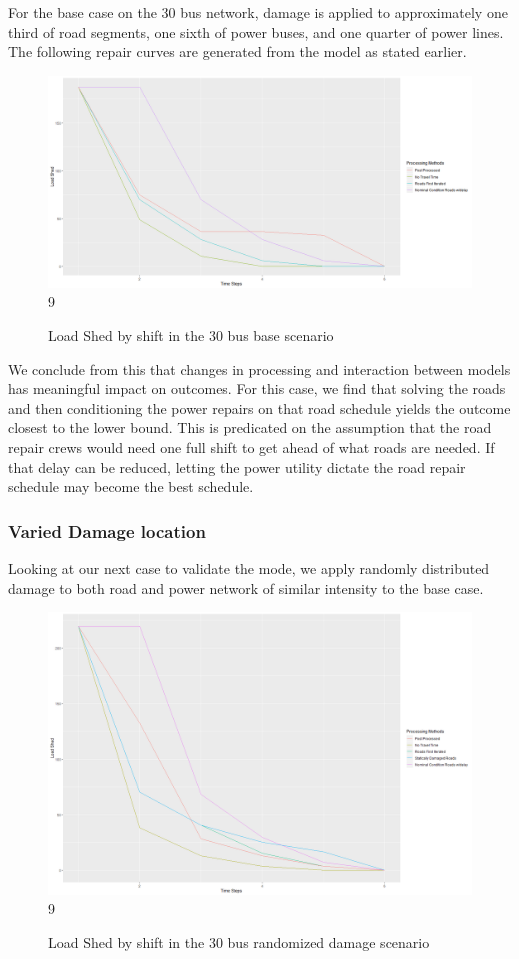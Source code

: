 \documentclass{article}
\begin{document}
	For the base case on the 30 bus network, damage is applied to approximately one third of road segments, one sixth of power buses, and one quarter of power lines. The following repair curves are generated from the model as stated earlier. 
	
	\begin{figure}[H]
		\centering
		
			\centering
			\includegraphics[width=.9\linewidth]{Rplot37.png}9
			\caption{Load Shed by shift in the 30 bus base scenario}
			\label{fig:sub1}
		\end{figure}
	
	We conclude from this that changes in processing and interaction between models has meaningful impact on outcomes. For this case, we find that solving the roads and then conditioning the power repairs on that road schedule yields the outcome closest to the lower bound. This is predicated on the assumption that the road repair crews would need one full shift to get ahead of what roads are needed. If that delay can be reduced, letting the power utility dictate the road repair schedule may become the best schedule.
	
	\subsubsection{Varied Damage location}
	Looking at our next case to validate the mode, we apply randomly distributed damage to both road and power network of similar intensity to the base case.
		\begin{figure}[H]
		\centering
		
		\centering
		\includegraphics[width=.9\linewidth]{Rplot30Rand.png}9
		\caption{Load Shed by shift in the 30 bus randomized damage scenario}
		\label{fig:sub1}
	\end{figure}
\end{document}
